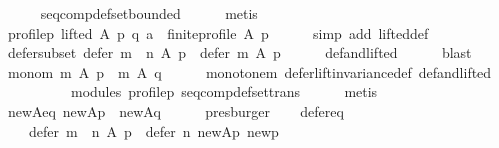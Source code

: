 \begin{isabellebody}
\ \ \ \ \isamarkupfalse%
\ seq{\isacharunderscore}{\kern0pt}comp{\isacharunderscore}{\kern0pt}def{\isacharunderscore}{\kern0pt}set{\isacharunderscore}{\kern0pt}bounded\isanewline
\ \ \ \ \isamarkupfalse%
\ metis\isanewline
\ \ \isamarkupfalse%
\ \isamarkupfalse%
\ profile{\isacharunderscore}{\kern0pt}p{\isacharcolon}{\kern0pt}\ {\isachardoublequoteopen}lifted\ A\ p\ q\ a\ {\isasymlongrightarrow}\ finite{\isacharunderscore}{\kern0pt}profile\ A\ p{\isachardoublequoteclose}\isanewline
\ \ \ \ \isamarkupfalse%
\ {\isacharparenleft}{\kern0pt}simp\ add{\isacharcolon}{\kern0pt}\ lifted{\isacharunderscore}{\kern0pt}def{\isacharparenright}{\kern0pt}\isanewline
\ \ \isamarkupfalse%
\ \isamarkupfalse%
\ defer{\isacharunderscore}{\kern0pt}subset{\isacharcolon}{\kern0pt}\ {\isachardoublequoteopen}defer\ {\isacharparenleft}{\kern0pt}m\ {\isasymtriangleright}\ n{\isacharparenright}{\kern0pt}\ A\ p\ {\isasymsubseteq}\ defer\ m\ A\ p{\isachardoublequoteclose}\isanewline
\ \ \ \ \isamarkupfalse%
\ def{\isacharunderscore}{\kern0pt}and{\isacharunderscore}{\kern0pt}lifted\isanewline
\ \ \ \ \isamarkupfalse%
\ blast\isanewline
\ \ \isamarkupfalse%
\ mono{\isacharunderscore}{\kern0pt}m{\isacharcolon}{\kern0pt}\ {\isachardoublequoteopen}m\ A\ p\ {\isacharequal}{\kern0pt}\ m\ A\ q{\isachardoublequoteclose}\isanewline
\ \ \ \ \isamarkupfalse%
\ monotone{\isacharunderscore}{\kern0pt}m\ defer{\isacharunderscore}{\kern0pt}lift{\isacharunderscore}{\kern0pt}invariance{\isacharunderscore}{\kern0pt}def\ def{\isacharunderscore}{\kern0pt}and{\isacharunderscore}{\kern0pt}lifted\isanewline
\ \ \ \ \ \ \ \ \ \ modules\ profile{\isacharunderscore}{\kern0pt}p\ seq{\isacharunderscore}{\kern0pt}comp{\isacharunderscore}{\kern0pt}def{\isacharunderscore}{\kern0pt}set{\isacharunderscore}{\kern0pt}trans\isanewline
\ \ \ \ \isamarkupfalse%
\ metis\isanewline
\ \ \isamarkupfalse%
\ new{\isacharunderscore}{\kern0pt}A{\isacharunderscore}{\kern0pt}eq{\isacharcolon}{\kern0pt}\ {\isachardoublequoteopen}{\isacharquery}{\kern0pt}new{\isacharunderscore}{\kern0pt}Ap\ {\isacharequal}{\kern0pt}\ {\isacharquery}{\kern0pt}new{\isacharunderscore}{\kern0pt}Aq{\isachardoublequoteclose}\isanewline
\ \ \ \ \isamarkupfalse%
\ presburger\isanewline
\ \ \isamarkupfalse%
\ defer{\isacharunderscore}{\kern0pt}eq{\isacharcolon}{\kern0pt}\isanewline
\ \ \ \ {\isachardoublequoteopen}defer\ {\isacharparenleft}{\kern0pt}m\ {\isasymtriangleright}\ n{\isacharparenright}{\kern0pt}\ A\ p\ {\isacharequal}{\kern0pt}\ defer\ n\ {\isacharquery}{\kern0pt}new{\isacharunderscore}{\kern0pt}Ap\ {\isacharquery}{\kern0pt}new{\isacharunderscore}{\kern0pt}p{\isachardoublequoteclose}\isanewline

\end{isabellebody}
